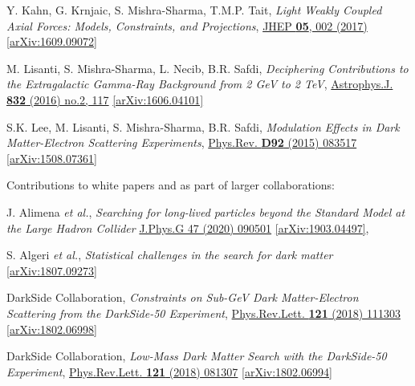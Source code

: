 \documentclass[11pt]{article}
\newenvironment{packed_enumerate}[1][]{
\begin{etaremune}[#1]
  \setlength{\itemsep}{3pt}
  \setlength{\parskip}{0pt}
  \setlength{\parsep}{0pt}}{\end{etaremune}
}
\begin{document}
\begin{packed_enumerate}[start=24]
  \item Y. Kahn, G. Krnjaic, S. Mishra-Sharma, T.M.P. Tait, \emph{Light Weakly Coupled Axial Forces: Models, Constraints, and Projections},  \href{https://link.springer.com/article/10.1007%2FJHEP05%282017%29002}{JHEP \textbf{05}, 002 (2017)}  \href{https://arxiv.org/abs/1609.09072}{[arXiv:1609.09072]}

  \item M. Lisanti, S. Mishra-Sharma, L. Necib, B.R. Safdi, \emph{Deciphering Contributions to the Extragalactic Gamma-Ray Background from 2 GeV to 2 TeV},  \href{http://iopscience.iop.org/article/10.3847/0004-637X/832/2/117/meta}{Astrophys.J. \textbf{832} (2016) no.2, 117} \href{https://arxiv.org/abs/1606.04101}{[arXiv:1606.04101]}

  \item S.K. Lee, M. Lisanti, S. Mishra-Sharma, B.R. Safdi, \emph{Modulation Effects in Dark Matter-Electron Scattering Experiments}, \href{https://journals.aps.org/prd/abstract/10.1103/PhysRevD.92.083517}{Phys.Rev. \textbf{D92} (2015) 083517} \href{https://arxiv.org/abs/1508.07361}{[arXiv:1508.07361]}
\end{packed_enumerate}

\noindent
Contributions to white papers and as part of larger collaborations:

\begin{packed_enumerate}[start=4]
  \item J. Alimena \emph{et al.}, \emph{Searching for long-lived particles beyond the Standard Model at the Large Hadron Collider}  \href{https://iopscience.iop.org/article/10.1088/1361-6471/ab4574}{J.Phys.G 47 (2020) 090501} \href{https://arxiv.org/abs/1903.04497}{[arXiv:1903.04497]}, 

  \item S. Algeri \emph{et al.}, \emph{Statistical challenges in the search for dark matter} \href{https://arxiv.org/abs/1807.09273}{[arXiv:1807.09273]}

  \item DarkSide Collaboration, \emph{Constraints on Sub-GeV Dark Matter-Electron Scattering from the DarkSide-50 Experiment}, \href{https://journals.aps.org/prl/abstract/10.1103/PhysRevLett.121.111303}{Phys.Rev.Lett. \textbf{121} (2018) 111303} \href{https://arxiv.org/abs/1802.06998}{[arXiv:1802.06998]}

  \item DarkSide Collaboration, \emph{Low-Mass Dark Matter Search with the DarkSide-50 Experiment}, \href{https://journals.aps.org/prl/abstract/10.1103/PhysRevLett.121.081307}{Phys.Rev.Lett. \textbf{121} (2018) 081307}  \href{https://arxiv.org/abs/1802.06994}{[arXiv:1802.06994]}
\end{packed_enumerate}
\vspace{2.0mm}
\end{document}
